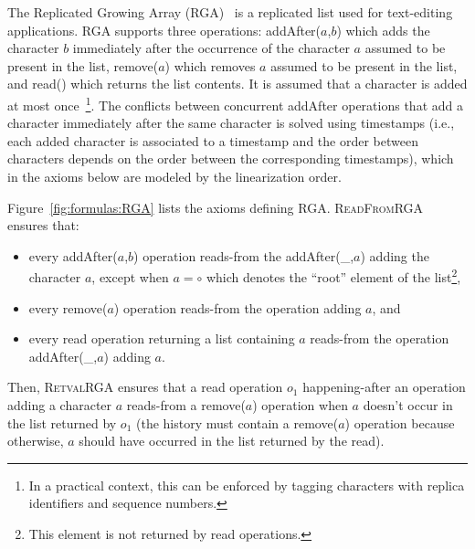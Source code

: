 The Replicated Growing Array (RGA)~\cite{DBLP:journals/jpdc/RohJKL11} is a replicated list used for text-editing applications.
%
RGA supports three operations:
{\sf addAfter}($a$,$b$) which adds the character
  $b$
  immediately after the occurrence of the character $a$
  assumed to be present in the list,
  {\sf remove}($a$) which removes $a$
  assumed to be present in the list, and
{\sf read}() which returns the list contents.
It is assumed that a character is added at most once~\footnote{In a practical context, this can be enforced by tagging characters with replica identifiers and sequence numbers.}.
The conflicts between concurrent {\sf addAfter} operations that add a character immediately after the same character is solved using timestamps (i.e., each added character is associated to a timestamp and the order between characters depends on the order between the corresponding timestamps), which in the axioms below are modeled by the linearization order.

Figure~\ref{fig:formulas:RGA} lists the axioms defining RGA. \textsc{ReadFromRGA} ensures that:
\vspace{-1.5mm}
\begin{itemize}
\item every {\sf addAfter}($a$,$b$) operation reads-from the {\sf addAfter}(\_,$a$) adding the character $a$, except when $a=\circ$ which denotes the ``root'' element of the list\footnote{This element is not returned by {\sf read} operations.}, 
\item every {\sf remove}($a$) operation reads-from the operation adding $a$, and 
\item every {\sf read} operation returning a list containing $a$ reads-from the operation {\sf addAfter}(\_,$a$)  adding $a$. 
\vspace{-1.5mm}
\end{itemize}

Then, \textsc{RetvalRGA} ensures that a {\sf read} operation $o_1$ happening-after an operation adding a character $a$ reads-from a {\sf remove}($a$) operation when $a$ doesn't occur in the list returned by $o_1$ (the history must contain a {\sf remove}($a$) operation because otherwise, $a$ should have occurred in the list returned by the {\sf read}). 

